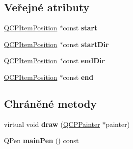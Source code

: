 \subsection*{Veřejné atributy}
\begin{DoxyCompactItemize}
\item 
\hypertarget{classQCPItemCurve_a20c3b5ea31c33764f4f30c2ec7ae518b}{}\hyperlink{classQCPItemPosition}{Q\+C\+P\+Item\+Position} $\ast$const {\bfseries start}\label{classQCPItemCurve_a20c3b5ea31c33764f4f30c2ec7ae518b}

\item 
\hypertarget{classQCPItemCurve_aa124bf66c09cc51c627fb49db8bf8a7b}{}\hyperlink{classQCPItemPosition}{Q\+C\+P\+Item\+Position} $\ast$const {\bfseries start\+Dir}\label{classQCPItemCurve_aa124bf66c09cc51c627fb49db8bf8a7b}

\item 
\hypertarget{classQCPItemCurve_a28181a9dee9cc3c3da83a883221bd2d0}{}\hyperlink{classQCPItemPosition}{Q\+C\+P\+Item\+Position} $\ast$const {\bfseries end\+Dir}\label{classQCPItemCurve_a28181a9dee9cc3c3da83a883221bd2d0}

\item 
\hypertarget{classQCPItemCurve_a24ecbb195b32a08b42b61c2cf08a1b4d}{}\hyperlink{classQCPItemPosition}{Q\+C\+P\+Item\+Position} $\ast$const {\bfseries end}\label{classQCPItemCurve_a24ecbb195b32a08b42b61c2cf08a1b4d}

\end{DoxyCompactItemize}
\subsection*{Chráněné metody}
\begin{DoxyCompactItemize}
\item 
\hypertarget{classQCPItemCurve_a56cb5b72cd02db2eda598274a39839a9}{}virtual void {\bfseries draw} (\hyperlink{classQCPPainter}{Q\+C\+P\+Painter} $\ast$painter)\label{classQCPItemCurve_a56cb5b72cd02db2eda598274a39839a9}

\item 
\hypertarget{classQCPItemCurve_a8089126f5645b6edfbaddea49d1e8390}{}Q\+Pen {\bfseries main\+Pen} () const \label{classQCPItemCurve_a8089126f5645b6edfbaddea49d1e8390}

\end{DoxyCompactItemize}
